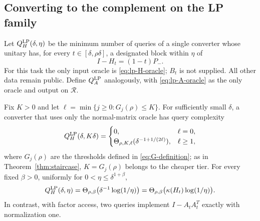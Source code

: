 \subsection{Converting to the complement on the LP family}
Let $Q_H^{\rm LP}(\delta,\eta)$ be the minimum number of queries of a single converter whose unitary has, for every $t\in[\delta,\rho\delta]$, a designated block within $\eta$ of
\[
 I-H_t=(1-t)P_-.
\]
For this task the only input oracle is \eqref{eq:lp-H-oracle}; $B_t$ is not supplied. All other data remain public. Define $Q_A^{\rm LP}$ analogously, with \eqref{eq:lp-A-oracle} as the only oracle and output on $\mathcal R$.

\begin{theorem}\label{thm:lp-compiler}
Fix $K>0$ and let $\ell=\min\{j\geq0:G_j(\rho)\leq K\}$. For sufficiently small $\delta$, a converter that uses only the normal-matrix oracle has query complexity
\begin{equation}\label{eq:lp-staircase}
 Q_H^{\rm LP}(\delta,K\delta)=
 \begin{cases}
 0,&\ell=0,\\
 \Theta_{\rho,K,\ell}(\delta^{-1+1/(2\ell)}),&\ell\geq1,
 \end{cases}
\end{equation}
where $G_j(\rho)$ are the thresholds defined in \eqref{eq:G-definition}; as in Theorem~\ref{thm:staircase}, $K=G_j(\rho)$ belongs to the cheaper tier. For every fixed $\beta>0$, uniformly for $0<\eta\leq\delta^{1+\beta}$,
\begin{equation}\label{eq:lp-joint}
 Q_H^{\rm LP}(\delta,\eta)
 =\Theta_{\rho,\beta}\bigl(\delta^{-1}\log(1/\eta)\bigr)
 =\Theta_{\rho,\beta}\bigl(\kappa(H_t)\log(1/\eta)\bigr).
\end{equation}
In contrast, with factor access, two queries implement $I-A_tA_t^T$ exactly with normalization one.
\end{theorem}
